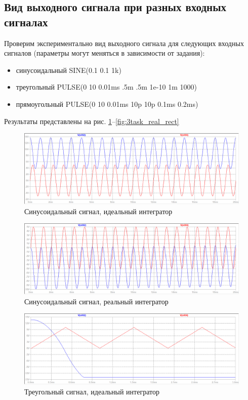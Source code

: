 \documentclass[a4paper, 12pt]{article}
\begin{document}
    \subsection{Вид выходного сигнала при разных входных сигналах}
    Проверим экспериментально вид выходного сигнала для следующих
    входных сигналов (параметры могут меняться в зависимости от задания): 
    \begin{itemize}
        \item синусоидальный SINE(0.1 0.1 1k)
        \item треугольный PULSE(0 10 0.01ms .5m .5m 1e-10 1m 1000)
        \item прямоугольный PULSE(0 10 0.01ms 10p 10p 0.1ms 0.2ms)
    \end{itemize}
    Результаты представлены на рис. \ref{fig:3task_ideal_sine}--\ref{fig:3task_real_rect}
    \begin{figure}[H]
        \centering
        \includegraphics[scale=0.46]{3task_ideal_sine.png}
        \captionsetup{skip=0pt}
        \caption{Синусоидальный сигнал, идеальный интегратор}
        \label{fig:3task_ideal_sine}
    \end{figure}
    \begin{figure}[H]
        \centering
        \includegraphics[scale=0.46]{3task_real_sine.png}
        \captionsetup{skip=0pt}
        \caption{Синусоидальный сигнал, реальный интегратор}
        \label{fig:3task_real_sine}
    \end{figure}
    \begin{figure}[H]
        \centering
        \includegraphics[scale=0.46]{3task_ideal_triangle.png}
        \captionsetup{skip=0pt}
        \caption{Треугольный сигнал, идеальный интегратор}
        \label{fig:3task_ideal_triangle}
    \end{figure}
\end{document}
